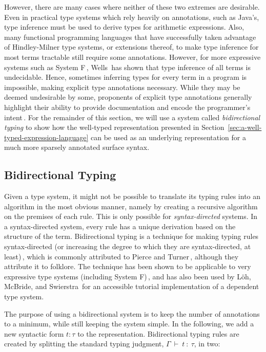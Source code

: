 However, there are many cases where neither of these two extremes are desirable. Even in practical type systems which rely heavily on annotations, such as Java's, type inference must be used to derive types for arithmetic expressions. Also, many functional programming languages that have successfully taken advantage of Hindley-Milner type systems, or extensions thereof, to make type inference for most terms tractable still require some annotations. However, for more expressive systems such as System F\,\cite[p. 341]{Pierce:TypeSystems}, Wells\,\cite{Wells96typability} has shown that type inference of all terms is undecidable. Hence, sometimes inferring types for every term in a program is impossible, making explicit type annotations necessary. While they may be deemed undesirable by some, proponents of explicit type annotations generally highlight their ability to provide documentation and encode the programmer's intent\,\cite{Dunfield:bidirectional}.
For the remainder of this section, we will use a system called \emph{bidirectional typing} to show how the well-typed representation presented in Section~\ref{sec:a-well-typed-expression-language} can be used as an underlying representation for a much more sparsely annotated surface syntax.

\subsection{Bidirectional Typing}
Given a type system, it might not be possible to translate its typing rules into an algorithm in the most obvious manner, namely by creating a recursive algorithm on the premises of each rule. This is only possible for \emph{syntax-directed} systems. In a syntax-directed system, every rule has a unique derivation based on the structure of the term. Bidirectional typing is a technique for making typing rules syntax-directed (or increasing the degree to which they are syntax-directed, at least)\,\cite{Christiansen:bidirectional}, which is commonly attributed to Pierce and Turner\,\cite{Pierce:2000}, although they attribute it to folklore. The technique has been shown to be applicable to very expressive type systems (including System F)\,\cite{Dunfield13:bidir}, and has also been used by L\"{o}h, McBride, and Swierstra\,\cite{Loh:2010} for an accessible tutorial implementation of a dependent type system.

The purpose of using a bidirectional system is to keep the number of annotations to a minimum, while still keeping the system simple. In the following, we add a new syntactic form $t : \tau$ to the representation. Bidirectional typing rules are created by splitting the standard typing judgment, $\Gamma~\vdash~t~:~\tau$, in two:

